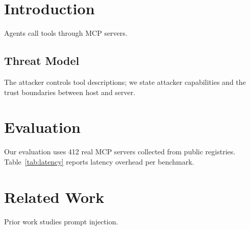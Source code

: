 \section{Introduction}
Agents call tools through MCP servers.
\subsection{Threat Model}
The attacker controls tool descriptions; we state attacker capabilities and the trust boundaries between host and server.
\section{Evaluation}
Our evaluation uses 412 real MCP servers collected from public registries.
Table~\ref{tab:latency} reports latency overhead per benchmark.
\section{Related Work}
Prior work studies prompt injection.
